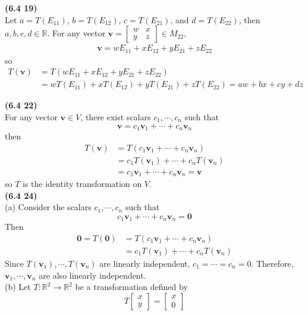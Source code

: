 \textbf{(6.4 19)} \\
Let $a = T(E_{11})$, $b = T(E_{12})$, $c = T(E_{21})$, and $d = T(E_{22})$, then $a, b, c, d \in \mathbb{R}$. For any vector $\textbf{v} = \begin{bmatrix}
	w & x \\ y & z
\end{bmatrix} \in M_{22}$, \begin{align*}
	\textbf{v} = wE_{11} + xE_{12} + yE_{21} + zE_{22}
\end{align*} so \begin{align*}
	T(\textbf{v}) &= T(wE_{11} + xE_{12} + yE_{21} + zE_{22}) \\
	&= wT(E_{11}) + xT(E_{12}) + yT(E_{21}) + zT(E_{22}) = aw + bx + cy + dz
\end{align*}

\textbf{(6.4 22)} \\
For any vector $\textbf{v} \in V$, there exist scalars $c_1, \cdots, c_n$ such that \begin{equation*}
	\textbf{v} = c_1\textbf{v}_1 + \cdots + c_n\textbf{v}_n
\end{equation*} then \begin{align*}
	T(\textbf{v}) &= T(c_1\textbf{v}_1 + \cdots + c_n\textbf{v}_n) \\
	&= c_1T(\textbf{v}_1) + \cdots + c_nT(\textbf{v}_n) \\
	&= c_1\textbf{v}_1 + \cdots + c_n\textbf{v}_n = \textbf{v}
\end{align*} so $T$ is the identity transformation on $V$. \\

\textbf{(6.4 24)} \\
(a) Consider the scalars $c_1, \cdots, c_n$ such that \begin{equation*}
	c_1\textbf{v}_1 + \cdots + c_n\textbf{v}_n = \textbf{0}
\end{equation*} Then \begin{align*}
	\textbf{0} = T(\textbf{0}) &= T(c_1\textbf{v}_1 + \cdots + c_n\textbf{v}_n)\\
	&= c_1T(\textbf{v}_1) + \cdots + c_nT(\textbf{v}_n)
\end{align*} Since $T(\textbf{v}_1), \cdots, T(\textbf{v}_n)$ are linearly independent, $c_1 = \cdots = c_n = 0$. Therefore, $\textbf{v}_1, \cdots, \textbf{v}_n$ are also linearly independent. \\

(b) Let $T: \mathbb{R}^2 \rightarrow \mathbb{R}^2$ be a transformation defined by \begin{equation*}
	T\begin{bmatrix}
		x \\ y
	\end{bmatrix} = \begin{bmatrix}
		x \\ 0
	\end{bmatrix}
\end{equation*}

